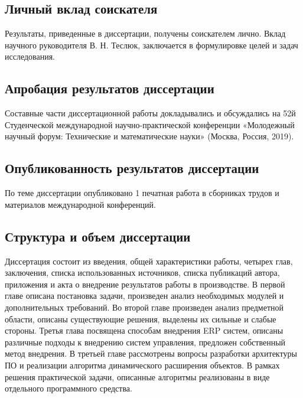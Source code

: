 \subsection*{Личный вклад соискателя}

Результаты, приведенные в диссертации, получены  соискателем лично.
Вклад научного руководителя В. Н. Теслюк, заключается в формулировке целей и задач исследования.

\subsection*{Апробация результатов диссертации}

Составные части диссертационной работы докладывались и обсуждались
на 52й Студенческой международной научно-практической конференции
«Молодежный научный форум: Технические и математические науки» (Москва, Россия, 2019).

\subsection*{Опубликованность результатов диссертации}

По теме диссертации опубликовано 1 печатная работа в сборниках трудов и материалов
международной конференций.


\subsection*{Структура и объем диссертации}

Диссертация состоит из введения, общей характеристики работы, четырех глав, заключения,
списка использованных источников, списка публикаций автора, приложения и акта о внедрение результатов
работы в производстве. В первой главе описана постановка задачи, произведен анализ необходимых
модулей и дополнительных требований. Во второй главе произведен анализ предметной области,
описаны существующие решения, выделены их сильные и слабые стороны.
Третья глава посвящена способам внедрения ERP систем, описаны различные подходы к внедрению
систем управления, предложен собственный метод внедрения.
В третьей главе рассмотрены вопросы разработки архитектуры ПО и реализации алгоритма
динамического расширения объектов.
В рамках решения практической задачи, описанные алгоритмы реализованы в виде отдельного
программного средства.
